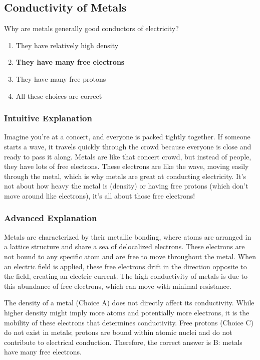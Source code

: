 \subsection{Conductivity of Metals}
\label{T5A07}

\begin{tcolorbox}[colback=gray!10!white,colframe=black!75!black,title=T5A07]
Why are metals generally good conductors of electricity?
\begin{enumerate}[label=\Alph*)]
    \item They have relatively high density
    \item \textbf{They have many free electrons}
    \item They have many free protons
    \item All these choices are correct
\end{enumerate}
\end{tcolorbox}

\subsubsection{Intuitive Explanation}
Imagine you're at a concert, and everyone is packed tightly together. If someone starts a wave, it travels quickly through the crowd because everyone is close and ready to pass it along. Metals are like that concert crowd, but instead of people, they have lots of free electrons. These electrons are like the wave, moving easily through the metal, which is why metals are great at conducting electricity. It's not about how heavy the metal is (density) or having free protons (which don't move around like electrons), it's all about those free electrons!

\subsubsection{Advanced Explanation}
Metals are characterized by their metallic bonding, where atoms are arranged in a lattice structure and share a sea of delocalized electrons. These electrons are not bound to any specific atom and are free to move throughout the metal. When an electric field is applied, these free electrons drift in the direction opposite to the field, creating an electric current. The high conductivity of metals is due to this abundance of free electrons, which can move with minimal resistance.

The density of a metal (Choice A) does not directly affect its conductivity. While higher density might imply more atoms and potentially more electrons, it is the mobility of these electrons that determines conductivity. Free protons (Choice C) do not exist in metals; protons are bound within atomic nuclei and do not contribute to electrical conduction. Therefore, the correct answer is B: metals have many free electrons.

